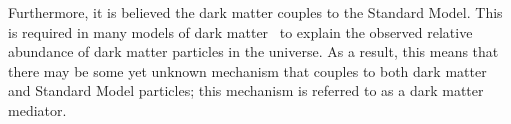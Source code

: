 %

Furthermore, it is believed the dark matter couples to the Standard Model.
This is required in many models of dark matter~\cite{theo-bsm_dm_feng} to explain the
observed relative abundance of dark matter particles in the universe.
As a result, this means that there may be some yet unknown mechanism that couples to both dark matter and
Standard Model particles; this mechanism is referred to as a dark matter mediator.

